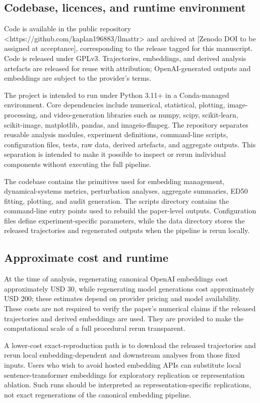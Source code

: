 \documentclass{article}
\theoremstyle{plain}
\theoremstyle{definition}
\begin{document}
\subsection{Codebase, licences, and runtime environment}

Code is available in the public repository <https://github.com/kaplan196883/llmattr> and archived at [Zenodo DOI to be assigned at acceptance], corresponding to the release tagged for this manuscript. Code is released under GPLv3. Trajectories, embeddings, and derived analysis artefacts are released for reuse with attribution; OpenAI-generated outputs and embeddings are subject to the provider's terms.

The project is intended to run under Python 3.11+ in a Conda-managed environment. Core dependencies include numerical, statistical, plotting, image-processing, and video-generation libraries such as numpy, scipy, scikit-learn, scikit-image, matplotlib, pandas, and imageio-ffmpeg. The repository separates reusable analysis modules, experiment definitions, command-line scripts, configuration files, tests, raw data, derived artefacts, and aggregate outputs. This separation is intended to make it possible to inspect or rerun individual components without executing the full pipeline.

The codebase contains the primitives used for embedding management, dynamical-systems metrics, perturbation analyses, aggregate summaries, ED50 fitting, plotting, and audit generation. The scripts directory contains the command-line entry points used to rebuild the paper-level outputs. Configuration files define experiment-specific parameters, while the data directory stores the released trajectories and regenerated outputs when the pipeline is rerun locally.

\subsection{Approximate cost and runtime}

At the time of analysis, regenerating canonical OpenAI embeddings cost approximately USD 30, while regenerating model generations cost approximately USD 200; these estimates depend on provider pricing and model availability. These costs are not required to verify the paper's numerical claims if the released trajectories and derived embeddings are used. They are provided to make the computational scale of a full procedural rerun transparent.

A lower-cost exact-reproduction path is to download the released trajectories and rerun local embedding-dependent and downstream analyses from those fixed inputs. Users who wish to avoid hosted embedding APIs can substitute local sentence-transformer embeddings for exploratory replication or representation ablation. Such runs should be interpreted as representation-specific replications, not exact regenerations of the canonical embedding pipeline.
\end{document}
